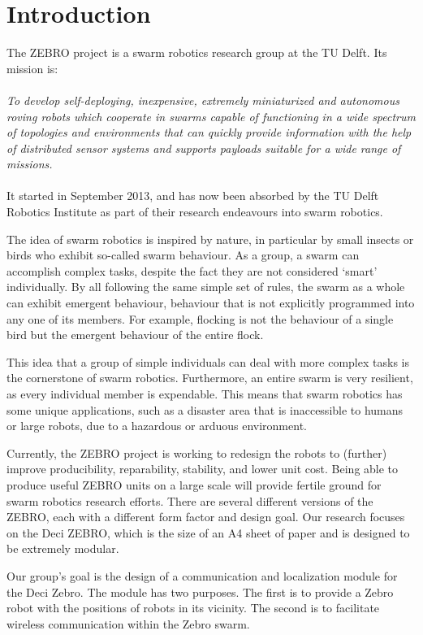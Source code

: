 \chapter{Introduction}

The ZEBRO project is a swarm robotics research group at the TU Delft.
Its mission is:
\\\\
\emph{To develop self-deploying, inexpensive, extremely miniaturized and autonomous roving robots which cooperate in swarms capable of functioning in a wide spectrum of topologies and environments that can quickly provide information with the help of distributed sensor systems and supports payloads suitable for a wide range of missions.}
\\\\
It started in September 2013, and has now been absorbed by the TU Delft Robotics Institute as part of their research endeavours into swarm robotics.

The idea of swarm robotics is inspired by nature, in particular by small insects or birds who exhibit so-called swarm behaviour.
As a group, a swarm can accomplish complex tasks, despite the fact they are not considered `smart' individually.
By all following the same simple set of rules, the swarm as a whole can exhibit emergent behaviour, behaviour that is not explicitly programmed into any one of its members.
For example, flocking is not the behaviour of a single bird but the emergent behaviour of the entire flock.

This idea that a group of simple individuals can deal with more complex tasks is the cornerstone of swarm robotics.
Furthermore, an entire swarm is very resilient, as every individual member is expendable.
This means that swarm robotics has some unique applications, such as a disaster area that is inaccessible to humans or large robots, due to a hazardous or arduous environment.

Currently, the ZEBRO project is working to redesign the robots to (further) improve producibility, reparability, stability, and lower unit cost.
Being able to produce useful ZEBRO units on a large scale will provide fertile ground for swarm robotics research efforts.
There are several different versions of the ZEBRO, each with a different form factor and design goal.
Our research focuses on the Deci ZEBRO, which is the size of an A4 sheet of paper and is designed to be extremely modular.

Our group's goal is the design of a communication and localization module for the Deci Zebro.
The module has two purposes.
The first is to provide a Zebro robot with the positions of robots in its vicinity.
The second is to facilitate wireless communication within the Zebro swarm.

